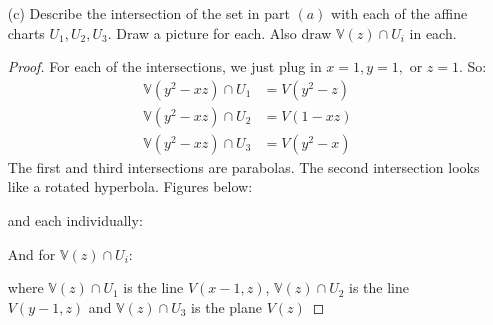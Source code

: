 \documentclass{article}
\begin{document}
\begin{itemize}
        \item [(c)] Describe the intersection of the set in part $(a)$ with each of the affine charts $U_{1}, U_{2}, U_{3}$. Draw a picture for each. Also draw $\mathbb{V}(z) \cap U_{i}$ in each. 
            \begin{proof}
                For each of the intersections, we just plug in $x = 1, y = 1, $ or $z = 1$. So:
                    \begin{align*}
                        \mathbb{V}(y^{2} - xz) \cap U_{1} &= V(y^{2} - z) \\
                        \mathbb{V}(y^{2} - xz) \cap U_{2} &= V(1 - xz)    \\
                        \mathbb{V}(y^{2} - xz) \cap U_{3} &= V(y^{2} - x)   
                    \end{align*}
                The first and third intersections are parabolas. The second intersection looks like a rotated hyperbola. Figures below:
                    \begin{fixedfigure}
                    \end{fixedfigure}
                and each individually:
                    \begin{fixedfigure}
                    \end{fixedfigure}
                And for $\mathbb{V}(z) \cap U_{i}$:
                    \begin{fixedfigure}
                    \end{fixedfigure}
                where $\mathbb{V}(z) \cap U_{1}$ is the line $V(x - 1, z)$, $\mathbb{V}(z) \cap U_{2}$ is the line $V(y - 1, z)$ and $\mathbb{V}(z) \cap U_{3}$ is the plane $V(z)$
            \end{proof}
    \end{itemize}
\end{document}
